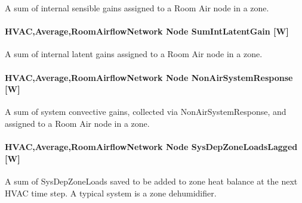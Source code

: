 A sum of internal sensible gains assigned to a Room Air node in a zone.

\paragraph{HVAC,Average,RoomAirflowNetwork Node SumIntLatentGain {[}W{]}}\label{hvacaverageroomairflownetwork-node-sumintlatentgain-w}

A sum of internal latent gains assigned to a Room Air node in a zone.

\paragraph{HVAC,Average,RoomAirflowNetwork Node NonAirSystemResponse {[}W{]}}\label{hvacaverageroomairflownetwork-node-nonairsystemresponse-w}

A sum of system convective gains, collected via NonAirSystemResponse, and assigned to a Room Air node in a zone.

\paragraph{HVAC,Average,RoomAirflowNetwork Node SysDepZoneLoadsLagged {[}W{]}}\label{hvacaverageroomairflownetwork-node-sysdepzoneloadslagged-w}

A sum of SysDepZoneLoads saved to be added to zone heat balance at the next HVAC time step. A typical system is a zone dehumidifier.
